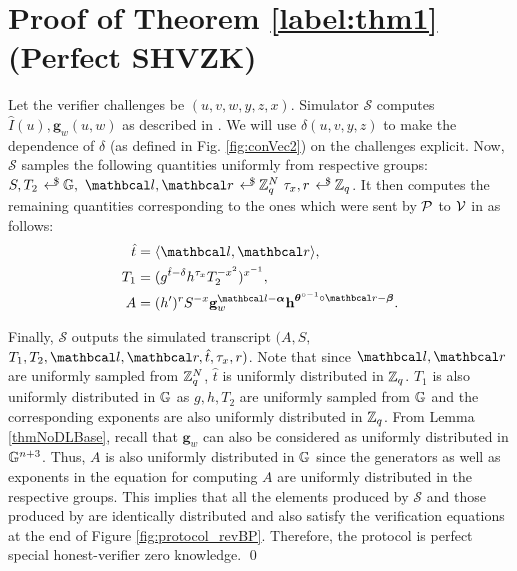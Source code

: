 \section{Proof of Theorem \ref{label:thm1} (Perfect SHVZK)}
\label{scnProofTheorem1}
\vspace{-2pt}
Let the verifier challenges be $(u, v, w, y, z, x)$. Simulator $\mathcal{S}$ computes $\hat{I}(u), \textbf{g}_w(u,w)$ as described in \protow. 
We will use $\delta(u,v,y,z)$ to make the dependence of $\delta$ (as defined in Fig. \ref{fig:conVec2}) on the challenges explicit.
Now, $\mathcal{S}$ samples the following quantities uniformly from respective groups: $S, T_2 \rgen \G, \ \lvec, \rvec \rgen \Z_q^N \ \tau_x, r \rgen \Z_q$.
It then computes the remaining quantities corresponding to the ones which were sent by $\P$ to $\V$ in \proto as follows:
\begin{align}
    \hat{t} &= \langle \lvec, \rvec \rangle,\\
    T_1 &= (g^{\hat{t} - \delta} h^{\tau_x} T_2^{-x^2})^{x^{-1}},\\
    A &= (h^{\prime})^r S^{-x} \textbf{g}_w^{\lvec - \vecnb{\alpha}} \textbf{h}^{\vecnb{\theta}^{\circ -1} \circ \rvec - \vecnb{\beta}}. \label{label:a}
\end{align}

Finally, $\mathcal{S}$ outputs the simulated transcript $(A, S,$ $T_1, T_2, \lvec, \rvec, \hat{t}, \tau_x, r)$. 
Note that since $\lvec, \rvec$ are uniformly sampled from $\Z_q^N$, $\hat{t}$ is uniformly distributed in $\Z_q$. $T_1$ is also uniformly distributed in $\G$ as $g,h, T_2$ are uniformly sampled from $\G$ and the corresponding exponents are also uniformly distributed in $\Z_q$.
From Lemma \ref{thmNoDLBase}, recall that $\textbf{g}_w$ can also be considered as uniformly distributed in $\G^{n+3}$. Thus, $A$ is also uniformly distributed in $\G$ since the generators as well as exponents in the equation for computing $A$ are uniformly distributed in the respective groups.
This implies that all the elements produced by $\mathcal{S}$ and those produced by \proto are identically distributed and also satisfy the verification equations at the end of Figure \ref{fig:protocol_revBP}.
Therefore, the protocol is perfect special honest-verifier zero knowledge. \hfill{\small \qed}


